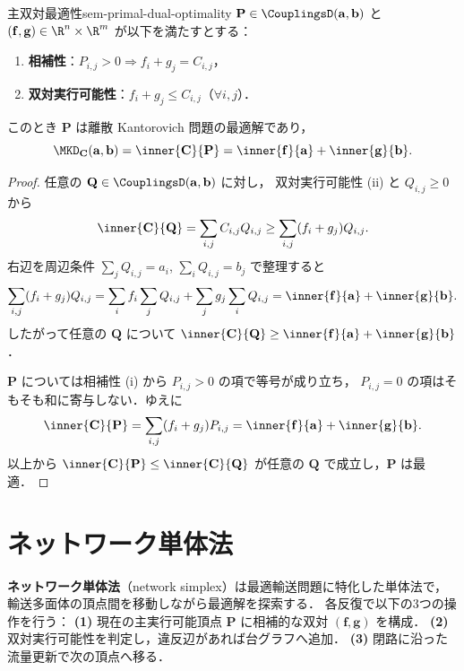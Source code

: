 \begin{claim}{主双対最適性}{sem-primal-dual-optimality}
  $\mathbf{P} \in \CouplingsD(\mathbf{a}, \mathbf{b})$ と
  $(\mathbf{f}, \mathbf{g}) \in \R^n \times \R^m$ が以下を満たすとする：
  \begin{enumerate}
    \item[(i)] \textbf{相補性}：$P_{i,j} > 0 \Longrightarrow f_i + g_j = C_{i,j}$，
    \item[(ii)] \textbf{双対実行可能性}：$f_i + g_j \leq C_{i,j}$（$\forall i, j$）．
  \end{enumerate}
  このとき $\mathbf{P}$ は離散 Kantorovich 問題の最適解であり，
  \[
    \MKD_{\mathbf{C}}(\mathbf{a}, \mathbf{b})
    = \inner{\mathbf{C}}{\mathbf{P}}
    = \inner{\mathbf{f}}{\mathbf{a}} + \inner{\mathbf{g}}{\mathbf{b}}.
  \]
\end{claim}

\begin{proof}
  任意の $\mathbf{Q} \in \CouplingsD(\mathbf{a}, \mathbf{b})$ に対し，
  双対実行可能性 (ii) と $Q_{i,j} \geq 0$ から
  \[
    \inner{\mathbf{C}}{\mathbf{Q}}
    = \sum_{i,j} C_{i,j} Q_{i,j}
    \geq \sum_{i,j} (f_i + g_j) Q_{i,j}.
  \]
  右辺を周辺条件 $\sum_j Q_{i,j} = a_i$, $\sum_i Q_{i,j} = b_j$ で整理すると
  \[
    \sum_{i,j} (f_i + g_j) Q_{i,j}
    = \sum_i f_i \sum_j Q_{i,j} + \sum_j g_j \sum_i Q_{i,j}
    = \inner{\mathbf{f}}{\mathbf{a}} + \inner{\mathbf{g}}{\mathbf{b}}.
  \]
  したがって任意の $\mathbf{Q}$ について
  $\inner{\mathbf{C}}{\mathbf{Q}} \geq \inner{\mathbf{f}}{\mathbf{a}} + \inner{\mathbf{g}}{\mathbf{b}}$．

  $\mathbf{P}$ については相補性 (i) から $P_{i,j} > 0$ の項で等号が成り立ち，
  $P_{i,j} = 0$ の項はそもそも和に寄与しない．ゆえに
  \[
    \inner{\mathbf{C}}{\mathbf{P}}
    = \sum_{i,j} (f_i + g_j) P_{i,j}
    = \inner{\mathbf{f}}{\mathbf{a}} + \inner{\mathbf{g}}{\mathbf{b}}.
  \]
  以上から
  $\inner{\mathbf{C}}{\mathbf{P}} \leq \inner{\mathbf{C}}{\mathbf{Q}}$
  が任意の $\mathbf{Q}$ で成立し，$\mathbf{P}$ は最適．
\end{proof}

\section{ネットワーク単体法}
\label{sec:sem-network-simplex}

\textbf{ネットワーク単体法}（network simplex）は最適輸送問題に特化した単体法で，
輸送多面体の頂点間を移動しながら最適解を探索する．
各反復で以下の3つの操作を行う：
\textbf{(1)} 現在の主実行可能頂点 $\mathbf{P}$ に相補的な双対 $(\mathbf{f}, \mathbf{g})$ を構成．
\textbf{(2)} 双対実行可能性を判定し，違反辺があれば台グラフへ追加．
\textbf{(3)} 閉路に沿った流量更新で次の頂点へ移る．

